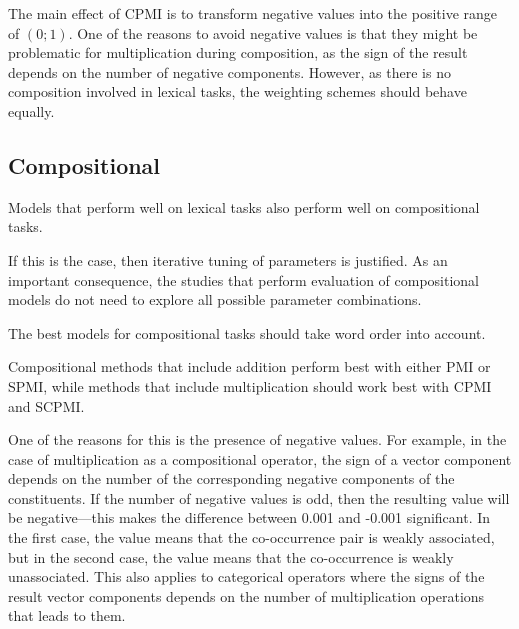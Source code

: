 The main effect of CPMI is to transform negative values into the positive range of $(0; 1)$. One of the reasons to avoid negative values is that they might be problematic for multiplication during composition, as the sign of the result depends on the number of negative components. However, as there is no composition involved in lexical tasks, the weighting schemes should behave equally.

\subsection{Compositional}
\label{sec:hyp-composition}

\begin{hyp}
\label{hyp:not-lextocomp}
Models that perform well on lexical tasks also perform well on compositional tasks.
\end{hyp}

If this is the case, then iterative tuning of parameters is justified. As an important consequence, the studies that perform evaluation of compositional models do not need to explore all possible parameter combinations.

\begin{hyp}
\label{hyp:order}
The best models for compositional tasks should take word order into account.
\end{hyp}


\begin{hyp}
  \label{hyp:comp-pmi-cpmi}
  Compositional methods that include addition perform best with either PMI or SPMI, while methods that include multiplication should work best with CPMI and SCPMI.
\end{hyp}

One of the reasons for this is the presence of negative values. For example, in the case of multiplication as a compositional operator, the sign of a vector component depends on the number of the corresponding negative components of the constituents. If the number of negative values is odd, then the resulting value will be negative---this makes the difference between 0.001 and -0.001 significant. In the first case, the value means that the co-occurrence pair is weakly associated, but in the second case, the value means that the co-occurrence is weakly unassociated. This also applies to categorical operators where the signs of the result vector components depends on the number of multiplication operations that leads to them.

